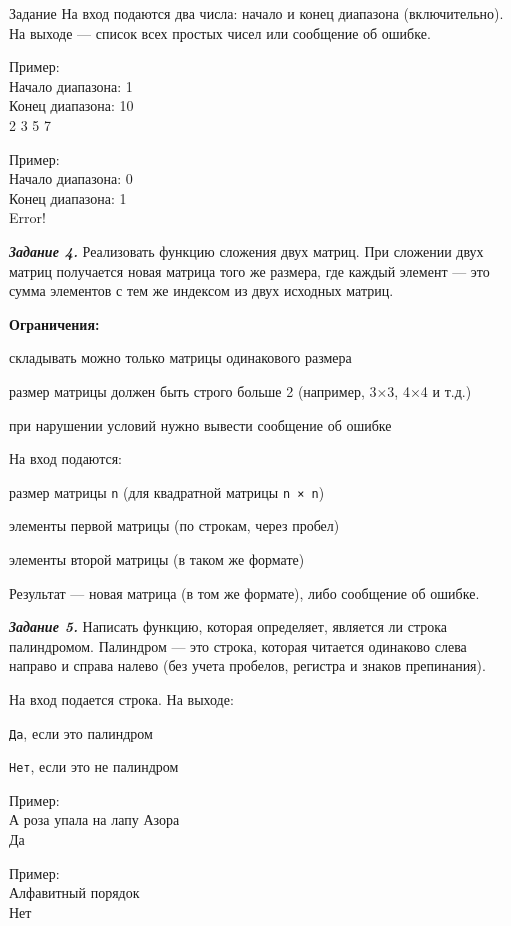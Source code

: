\documentclass[]{vvsu}
\begin{document}
\begin{addition}{Задание}
  На вход подаются два числа: начало и конец диапазона (включительно).  
  На выходе — список всех простых чисел или сообщение об ошибке.

  Пример:\\
    Начало диапазона: 1\\
    Конец диапазона: 10\\
    2 3 5 7

  Пример:\\
    Начало диапазона: 0\\
    Конец диапазона: 1\\
    Error!

  \textit{\textbf{Задание 4.}}  
  Реализовать функцию сложения двух матриц.  
  При сложении двух матриц получается новая матрица того же размера, где каждый элемент — это сумма элементов с тем же индексом из двух исходных матриц.

  \textbf{Ограничения:}
  \begin{vvsu_itemize}
    \item складывать можно только матрицы одинакового размера
    \item размер матрицы должен быть строго больше 2 (например, 3×3, 4×4 и т.д.)
    \item при нарушении условий нужно вывести сообщение об ошибке
  \end{vvsu_itemize}

  На вход подаются:
  \begin{vvsu_list}
    \item размер матрицы \texttt{n} (для квадратной матрицы \texttt{n × n})
    \item элементы первой матрицы (по строкам, через пробел)
    \item элементы второй матрицы (в таком же формате)
  \end{vvsu_list}

  Результат — новая матрица (в том же формате), либо сообщение об ошибке.

  \textit{\textbf{Задание 5.}}  
  Написать функцию, которая определяет, является ли строка палиндромом.  
  Палиндром — это строка, которая читается одинаково слева направо и справа налево (без учета пробелов, регистра и знаков препинания).

  На вход подается строка.  
  На выходе:
  \begin{vvsu_itemize}
    \item \texttt{Да}, если это палиндром
    \item \texttt{Нет}, если это не палиндром
  \end{vvsu_itemize}

  Пример:\\
    А роза упала на лапу Азора\\
    Да

  Пример:\\
    Алфавитный порядок\\
    Нет
\end{addition}
\end{document}
